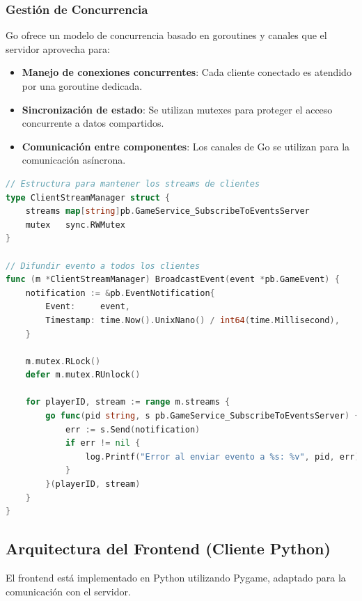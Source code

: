 \documentclass[11pt,letterpaper]{article}
\begin{document}
\subsubsection{Gestión de Concurrencia}

Go ofrece un modelo de concurrencia basado en goroutines y canales que el servidor aprovecha para:

\begin{itemize}
    \item \textbf{Manejo de conexiones concurrentes}: Cada cliente conectado es atendido por una goroutine dedicada.
    
    \item \textbf{Sincronización de estado}: Se utilizan mutexes para proteger el acceso concurrente a datos compartidos.
    
    \item \textbf{Comunicación entre componentes}: Los canales de Go se utilizan para la comunicación asíncrona.
\end{itemize}

\begin{lstlisting}[language=go, caption=Gestión de streams de clientes]
// Estructura para mantener los streams de clientes
type ClientStreamManager struct {
    streams map[string]pb.GameService_SubscribeToEventsServer
    mutex   sync.RWMutex
}

// Difundir evento a todos los clientes
func (m *ClientStreamManager) BroadcastEvent(event *pb.GameEvent) {
    notification := &pb.EventNotification{
        Event:     event,
        Timestamp: time.Now().UnixNano() / int64(time.Millisecond),
    }
    
    m.mutex.RLock()
    defer m.mutex.RUnlock()
    
    for playerID, stream := range m.streams {
        go func(pid string, s pb.GameService_SubscribeToEventsServer) {
            err := s.Send(notification)
            if err != nil {
                log.Printf("Error al enviar evento a %s: %v", pid, err)
            }
        }(playerID, stream)
    }
}
\end{lstlisting}

\subsection{Arquitectura del Frontend (Cliente Python)}

El frontend está implementado en Python utilizando Pygame, adaptado para la comunicación con el servidor.
\end{document}
